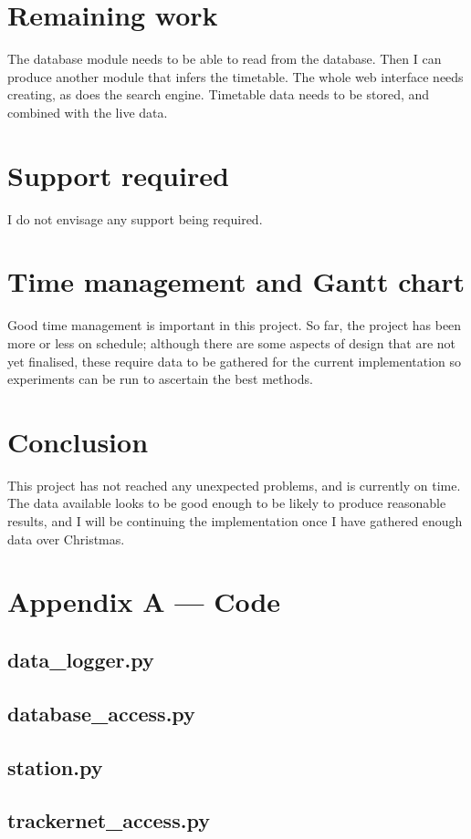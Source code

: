 \documentclass[a4paper,12pt]{article}
\begin{document}
\section{Remaining work}

The database module needs to be able to read from the database. Then I can
produce another module that infers the timetable. The whole web interface needs
creating, as does the search engine. Timetable data needs to be stored, and
combined with the live data.

\section{Support required}

I do not envisage any support being required.

\section{Time management and Gantt chart}

Good time management is important in this project. So far, the project has been
more or less on schedule; although there are some aspects of design that are
not yet finalised, these require data to be gathered for the current
implementation so experiments can be run to ascertain the best methods.



\section{Conclusion}

This project has not reached any unexpected problems, and is currently on time.
The data available looks to be good enough to be likely to produce reasonable
results, and I will be continuing the implementation once I have gathered
enough data over Christmas.

\section*{Appendix A --- Code}

\subsection*{data\_logger.py}



\subsection*{database\_access.py}



\subsection*{station.py}



\subsection*{trackernet\_access.py}






\end{document}
